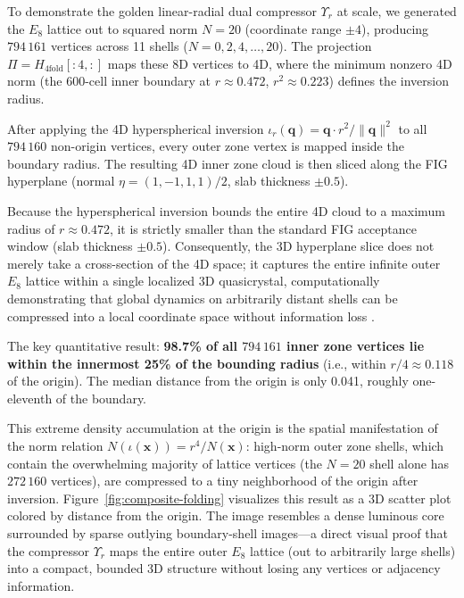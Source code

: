 \documentclass{article}
\begin{document}
To demonstrate the golden linear-radial dual compressor \(\Upsilon_r\) at scale, we generated the $E_8$ lattice out to squared norm $N = 20$ (coordinate range $\pm 4$), producing $794\,161$ vertices across 11 shells ($N = 0, 2, 4, \ldots, 20$).
The projection $\Pi = H_{4\mathrm{fold}}[:4,:]$ maps these 8D vertices to 4D, where the minimum nonzero 4D norm (the 600-cell inner boundary at $r \approx 0.472$, $r^2 \approx 0.223$) defines the inversion radius.

After applying the 4D hyperspherical inversion $\iota_r(\mathbf{q}) = \mathbf{q} \cdot r^2 / \|\mathbf{q}\|^2$ to all $794\,160$ non-origin vertices, every outer zone vertex is mapped inside the boundary radius. The resulting 4D inner zone cloud is then sliced along the FIG hyperplane (normal $\eta = (1,-1,1,1)/2$, slab thickness $\pm 0.5$).

Because the hyperspherical inversion bounds the entire 4D cloud to a maximum radius of $r \approx 0.472$, it is strictly smaller than the standard FIG acceptance window (slab thickness $\pm 0.5$). Consequently, the 3D hyperplane slice does not merely take a cross-section of the 4D space; it captures the entire infinite outer $E_8$ lattice within a single localized 3D quasicrystal, computationally demonstrating that global dynamics on arbitrarily distant shells can be compressed into a local coordinate space without information loss \cite{ClawsonFangIrwin2024}.

The key quantitative result: \textbf{98.7\% of all $794\,161$ inner zone vertices lie within the innermost 25\% of the bounding radius} (i.e., within $r/4 \approx 0.118$ of the origin). The median distance from the origin is only 0.041, roughly one-eleventh of the boundary.

This extreme density accumulation at the origin is the spatial manifestation of the norm relation $N(\iota(\mathbf{x})) = r^4/N(\mathbf{x})$: high-norm outer zone shells, which contain the overwhelming majority of lattice vertices (the $N = 20$ shell alone has $272\,160$ vertices), are compressed to a tiny neighborhood of the origin after inversion.
Figure~\ref{fig:composite-folding} visualizes this result as a 3D scatter plot colored by distance from the origin. The image resembles a dense luminous core surrounded by sparse outlying boundary-shell images---a direct visual proof that the compressor $\Upsilon_r$ maps the entire outer $E_8$ lattice (out to arbitrarily large shells) into a compact, bounded 3D structure without losing any vertices or adjacency information.
\end{document}
